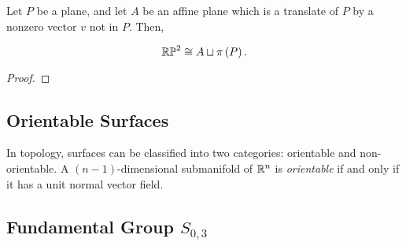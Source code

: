 \documentclass{amsart}
\begin{document}
	
	\begin{lemma}
		Let $P$ be a plane, and let $A$ be an affine plane which is a translate of $P$ by a nonzero vector $v$ not in $P$. Then,
		
		\begin{equation*}
			\mathbb{RP}^2 \cong A \sqcup \pi\left(P\right).
		\end{equation*}
	\end{lemma}
	
	\begin{proof}
	\end{proof}
	
	\subsection{Orientable Surfaces}
	
		In topology, surfaces can be classified into two categories: orientable and non-orientable. A $(n-1)$-dimensional submanifold of $\mathbb{R}^n$ is \emph{orientable} if and only if it has a unit normal vector field. 
	
	\begin{comment}
		In topology, surfaces can be classified into two categories: orientable and non-orientable.\todo[inline]{Giuseppe: find easiest definition of orientable} The idea behind this classification is the idea that if you were to place an object with a certain chirality on the surface, then every continuous loop that object takes around the surface will result in the object returning to its original position with the same chirality that it started with. If this can be done, the surface is classified as orientable. If there is a continuous loop that this object can take that results in the object returning to its original position, but is now the mirror image of how it started, then the surface is classified as non-orientable. 
	\end{comment}
	
	
	\subsection{Fundamental Group $S_{0,3}$}
	
\end{document}
